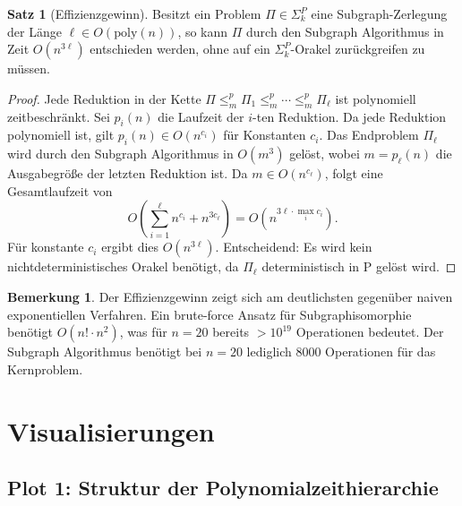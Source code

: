 ﻿\documentclass[a4paper,12pt]{article}
\theoremstyle{definition}
\newtheorem{satz}{Satz}
\newtheorem{bemerkung}{Bemerkung}
\begin{document}
\begin{satz}[Effizienzgewinn]
\label{satz:effizienz}
  Besitzt ein Problem $\Pi \in \Sigma_k^P$ eine Subgraph-Zerlegung
  der Länge $\ell \in O(\mathrm{poly}(n))$, so kann $\Pi$ durch den
  Subgraph Algorithmus in Zeit $O(n^{3\ell})$ entschieden werden,
  ohne auf ein $\Sigma_k^P$-Orakel zurückgreifen zu müssen.
\end{satz}

\begin{proof}
  Jede Reduktion in der Kette $\Pi \leq_m^p \Pi_1 \leq_m^p \cdots \leq_m^p \Pi_\ell$
  ist polynomiell zeitbeschränkt. Sei $p_i(n)$ die Laufzeit der $i$-ten Reduktion.
  Da jede Reduktion polynomiell ist, gilt $p_i(n) \in O(n^{c_i})$ für Konstanten $c_i$.
  Das Endproblem $\Pi_\ell$ wird durch den Subgraph Algorithmus in $O(m^3)$ gelöst,
  wobei $m = p_\ell(n)$ die Ausgabegröße der letzten Reduktion ist.
  Da $m \in O(n^{c_\ell})$, folgt eine Gesamtlaufzeit von
  \[
    O\!\left(\sum_{i=1}^{\ell} n^{c_i} + n^{3c_\ell}\right) = O(n^{3\ell \cdot \max_i c_i}).
  \]
  Für konstante $c_i$ ergibt dies $O(n^{3\ell})$. Entscheidend: Es wird kein
  nichtdeterministisches Orakel benötigt, da $\Pi_\ell$ deterministisch in P gelöst wird.
\end{proof}

\begin{bemerkung}
  Der Effizienzgewinn zeigt sich am deutlichsten gegenüber naiven exponentiellen
  Verfahren. Ein brute-force Ansatz für Subgraphisomorphie benötigt $O(n! \cdot n^2)$,
  was für $n = 20$ bereits $> 10^{19}$ Operationen bedeutet.
  Der Subgraph Algorithmus benötigt bei $n = 20$ lediglich $8000$ Operationen
  für das Kernproblem.
\end{bemerkung}

\section{Visualisierungen}

\subsection{Plot 1: Struktur der Polynomialzeithierarchie}
\label{sec:plot1}
\end{document}
